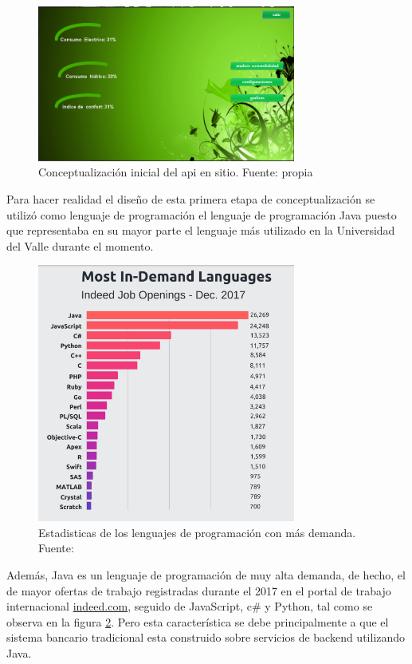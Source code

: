 \begin{figure}[htbp]
	\centerline{\includegraphics[width=8.5cm]{figuras/houseManager1.png}}
	\caption{Conceptualización inicial del api en sitio. Fuente: propia}
	\label{fig_0}
\end{figure}

Para hacer realidad el diseño de esta primera etapa de conceptualización se utilizó como lenguaje de programación el lenguaje de programación Java puesto que representaba en su mayor parte el lenguaje más utilizado en la Universidad del Valle durante el momento.

\begin{figure}[htbp]
	\centerline{\includegraphics[width=8.5cm]{./figuras/stadistics_job.png}}
	\caption{Estadisticas de los lenguajes de programación con más demanda. Fuente: \cite{stackoverflow2017}}
	\label{fig_1}
\end{figure}

Además, Java es un lenguaje de programación de muy alta demanda, de hecho, el de mayor ofertas de trabajo registradas durante el 2017 en el portal de trabajo internacional \href{https://co.indeed.com/?r=us}{indeed.com}, seguido de JavaScript, c\# y Python, tal como se observa en la figura \ref{fig_1}. Pero esta característica se debe principalmente a que el sistema bancario tradicional esta construido sobre servicios de backend utilizando Java.

